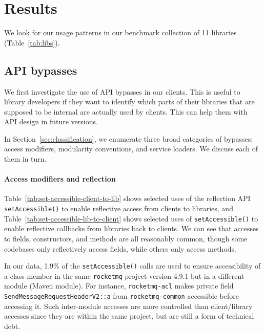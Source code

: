 \section{Results}
\label{sec:results}

We look for our usage patterns in our benchmark collection of 11 libraries (Table~\ref{tab:libs}).

\subsection{API bypasses}
We first investigate the use of API bypasses in our clients. This is useful to library developers if they want to identify which parts of their libraries that are supposed to be internal are actually used by clients. This can help them with API design in future versions. 

In Section~\ref{sec:classification}, we enumerate three broad categories
of bypasses: access modifiers, modularity conventions, and service loaders. We discuss each of them in turn.

%
%

\paragraph{Access modifiers and reflection}
Table~\ref{tab:set-accessible-client-to-lib}
shows selected uses of the reflection API \texttt{setAccessible()} to enable reflective access from clients to libraries,
and Table~\ref{tab:set-accessible-lib-to-client} shows selected uses of \texttt{setAccessible()} to enable reflective callbacks from libraries back to clients.
We can see that accesses to fields, constructors, and methods are all reasonably common, though some codebases only reflectively 
access fields, while others only access methods.

In our data, 1.9\% of the \texttt{setAccessible()} calls are 
used to ensure accessibility of a class member
in the same \texttt{rocketmq} project version 4.9.1 but in a different module (Maven module). 
For instance, \texttt{rocketmq-acl} makes private field \texttt{SendMessageRequestHeaderV2::a} from 
\texttt{rocketmq-common} accessible before accessing it. Such inter-module accesses are more controlled than client/library accesses since they are within the same project,
but are still a form of technical debt.

